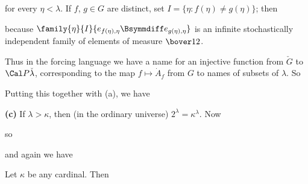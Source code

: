 {\noindent for every $\eta<\lambda$.   If $f$, $g\in G$ are distinct, set
$I=\{\eta:f(\eta)\ne g(\eta)\}$;  then


\noindent because
$\family{\eta}{I}{e_{f(\eta),\eta}\Bsymmdiff e_{g(\eta),\eta}}$
is an infinite
stochastically independent family of elements of measure $\bover12$.

Thus in the forcing language we have a name for an injective function from
$\check G$ to $\Cal P\check\lambda$,
corresponding to the map $f\mapsto\dot A_f$
from $G$ to names of subsets of $\lambda$.   So


\noindent Putting this together with (a), we have


\medskip

{\bf (c)} If $\lambda>\kappa$, then (in the ordinary universe)
$2^{\lambda}=\kappa^{\lambda}$.   Now


\noindent so


\noindent and again we have

}%

 Let $\kappa$ be any cardinal.   Then



